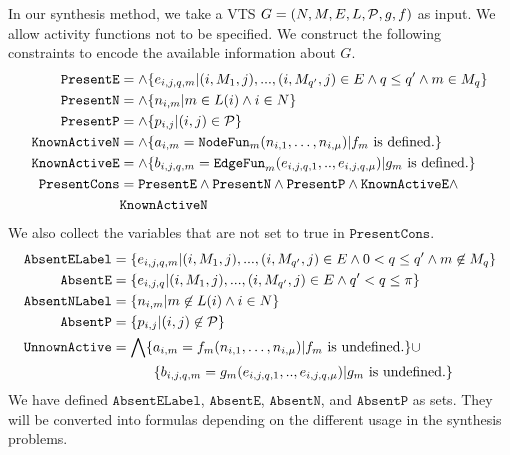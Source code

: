 In our synthesis method, we take a VTS $G =
(N,M,E,L,\mathcal{P},g,f)$ as input.
%
We allow activity functions not to be specified.
%
We construct the following constraints to encode the available information
about $G$.
%
\begin{align*}
  \texttt{PresentE} &= \land \{e_{i,j,q,m}|(i,M_1,j),...,(i,M_{q'},j) \in E \land q \leq q' \land m \in M_q \}\\
  \texttt{PresentN} &= \land \{n_{i,m}| m \in L(i) \land i \in N \}\\
  \texttt{PresentP} &= \land \{p_{i,j}| (i,j) \in \mathcal{P} \} \\
  \texttt{KnownActiveN} &= \land \{ a_{i,m} = \texttt{NodeFun}_m (n_{i,1},\dots,n_{i,\mu}) | f_m \text{ is defined.} \} \\
  \texttt{KnownActiveE} &= \land \{ b_{i,j,q,m} = \texttt{EdgeFun}_m(e_{i,j,q,1}, .., e_{i,j,q,\mu})
                   | g_m \text{ is defined.} \} \\
  \texttt{PresentCons} & = \texttt{PresentE} \land \texttt{PresentN} \land 
  \texttt{PresentP} \land \texttt{KnownActiveE} \land \\
  &  \texttt{KnownActiveN}
\end{align*}
We also collect the variables that are not set to true in $\texttt{PresentCons}$.
\begin{align*}
  \texttt{AbsentELabel} &=
  \{e_{i,j,q,m}|(i,M_1,j),...,(i,M_{q'},j) \in E \land 
                          0 < q \leq q' \land m \not\in M_{q} \}\\
  \texttt{AbsentE} &= \{e_{i,j,q}|(i,M_1,j),...,(i,M_{q'},j) \in E \land 
                    q' < q \leq \pi \}\\
  \texttt{AbsentNLabel} &= \{n_{i,m}| m \not\in L(i) \land i \in N \}\\
  \texttt{AbsentP} &= \{p_{i,j}| (i,j) \not\in \mathcal{P} \} \\
  \texttt{UnnownActive} &=  \bigwedge \{ a_{i,m} = f_m (n_{i,1},\dots,n_{i,\mu}) | f_m \text{ is undefined.} \} {\cup} \\
   &\quad\quad\quad  \{ b_{i,j,q,m} = g_m(e_{i,j,q,1}, .., e_{i,j,q,\mu})
                   | g_m \text{ is undefined.} \}
\end{align*}
We have defined $\texttt{AbsentELabel}$, $\texttt{AbsentE}$, $\texttt{AbsentN}$, and
$\texttt{AbsentP}$
as sets.
%
They will be converted into formulas depending
on the different usage in the synthesis problems. 

